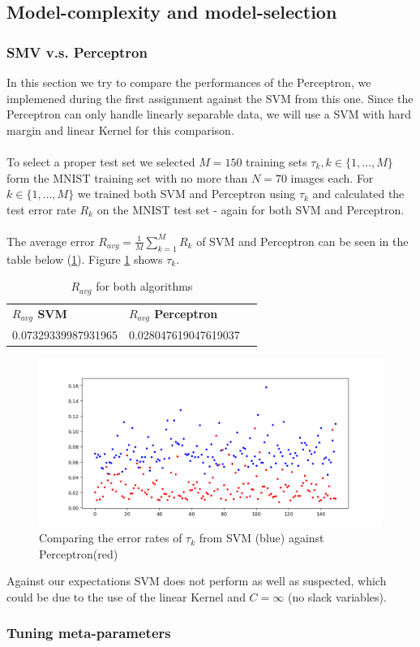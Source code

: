 \subsection{Model-complexity and model-selection}

\subsubsection{SMV v.s. Perceptron}

In this section we try to compare the performances of the Perceptron, we implemened during the first assignment against the SVM from this one.
Since the Perceptron can only handle linearly separable data, we will use a SVM with hard margin and linear Kernel for this comparison.
\\
\\
To select a proper test set we selected $M = 150$ training sets $\tau _{k},k \in \{1,\ldots,M\}$ form the MNIST training set with no more than $N = 70$ images each.
For $k \in \{1,\ldots,M\}$ we trained both SVM and Perceptron using $\tau_k$ and calculated the test error rate $R_k$ on the {MNIST} test set - again for both SVM and Perceptron.
\\
\\
The average error $R_{avg} = \frac{1}{M}\sum_{k=1}^M R_k$ of SVM and Perceptron can be seen in the table below (\ref{tab:avg_error}).
Figure \ref{fig:error_SVM_perc} shows $\tau_k$.

\begin{table}[!h]
\begin{tabular}{lll}
 \textbf{$R_{avg}$ SVM} & \textbf{ $R_{avg}$ Perceptron} \\
 0.07329339987931965       &     0.028047619047619037      \\
\end{tabular}
\caption{\label{tab:avg_error} $R_{avg}$ for both algorithms }
\end{table}

\begin{figure}[!h]
\begin{center}
\centering
\includegraphics[width=1\textwidth]{figures/lin_svm_perc_error.png}
\end{center}
\caption{\label{fig:error_SVM_perc} Comparing the error rates of $\tau_k$ from SVM (blue) against Perceptron(red) }
\end{figure}

Against our expectations SVM does not perform as well as suspected, which could be due to the use of the linear Kernel and $C=\infty$ (no slack variables).

\subsubsection{Tuning meta-parameters}